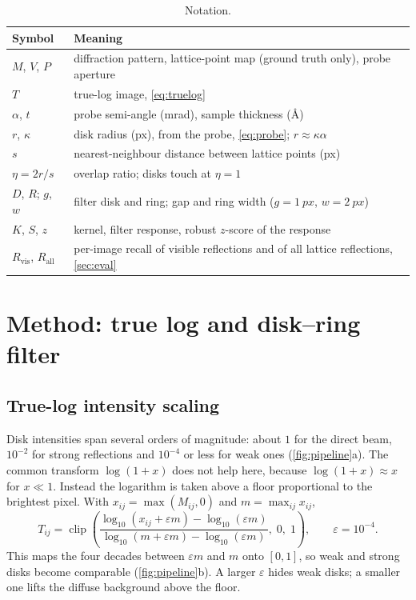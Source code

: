 \documentclass[11pt,a4paper]{article}
\DeclareMathOperator{\clip}{clip}
\newcommand{\Rvis}{R_{\mathrm{vis}}}
\newcommand{\Rall}{R_{\mathrm{all}}}
\begin{document}
\begin{table}[!htbp]
  \centering
  \caption{Notation.}
  \label{tab:notation}
  \small
  \begin{tabular}{ll}
    \toprule
    Symbol & Meaning \\
    \midrule
    $M$, $V$, $P$         & diffraction pattern, lattice-point map (ground truth only), probe aperture \\
    $T$                    & true-log image, \cref{eq:truelog} \\
    $\alpha$, $t$          & probe semi-angle (mrad), sample thickness (\si{\angstrom}) \\
    $r$, $\kappa$          & disk radius (px), from the probe, \cref{eq:probe}; $r \approx \kappa\alpha$ \\
    $s$                    & nearest-neighbour distance between lattice points (px) \\
    $\eta = 2r/s$          & overlap ratio; disks touch at $\eta = 1$ \\
    $D$, $R$; $g$, $w$     & filter disk and ring; gap and ring width ($g = \SI{1}{px}$, $w = \SI{2}{px}$) \\
    $K$, $S$, $z$          & kernel, filter response, robust $z$-score of the response \\
    $\Rvis$, $\Rall$       & per-image recall of visible reflections and of all lattice reflections, \cref{sec:eval} \\
    \bottomrule
  \end{tabular}
\end{table}

\section{Method: true log and disk--ring filter}\label{sec:method}

\subsection{True-log intensity scaling}
Disk intensities span several orders of magnitude: about $1$ for the direct beam, $10^{-2}$ for strong reflections and
$10^{-4}$ or less for weak ones (\cref{fig:pipeline}a). The common transform $\log(1+x)$ does not help here, because
$\log(1+x) \approx x$ for $x \ll 1$. Instead the logarithm is taken above a floor proportional to the brightest pixel.
With $x_{ij} = \max(M_{ij}, 0)$ and $m = \max_{ij} x_{ij}$,
\begin{equation}
  T_{ij} = \clip\!\left(
    \frac{\log_{10}(x_{ij} + \varepsilon m) - \log_{10}(\varepsilon m)}
         {\log_{10}(m + \varepsilon m) - \log_{10}(\varepsilon m)},\; 0,\; 1\right),
  \qquad \varepsilon = 10^{-4}.
  \label{eq:truelog}
\end{equation}
This maps the four decades between $\varepsilon m$ and $m$ onto $[0, 1]$, so weak and strong disks become comparable
(\cref{fig:pipeline}b). A larger $\varepsilon$ hides weak disks; a smaller one lifts the diffuse background above the floor.
\end{document}
